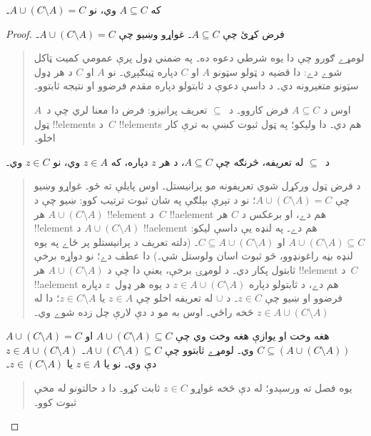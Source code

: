 \documentclass[../../../include/open-logic-section]{subfiles}
\begin{document}


\begin{prop}
که $A \subseteq C$ وي، نو $A \cup (C \setminus A) = C$۔
\end{prop}  

\begin{proof}
  فرض کړئ چې $A \subseteq C$۔ غواړو وښيو چې $A \cup (C
  \setminus A) = C$۔
  \begin{quote}
    لومړے ګورو چې دا يوه شرطي دعوه ده۔ په ضمني ډول پرې عمومي
    کمیت ټاکل شوے دے: دا قضيه د ټولو سټونو $A$ او $C$ دپاره
    ټينګېږي۔ نو $A$ او $C$ د هر ډول سټونو متغيرونه دي۔ د داسې
    دعوې د ثابتولو دپاره مقدم فرضوو او نتيجه ثابتوو۔

    اوس د $A \subseteq C$ فرض کاروو۔ د~$\subseteq$ تعريف
    پرانيزو: فرض دا معنا لري چې د~$A$ ټول !!{element}s د~$C$
    !!{element}s هم دي۔ دا وليکو؛ په ټول ثبوت کښې به ترې کار اخلو۔
  \end{quote}
  د~$\subseteq$ له تعريفه، څرنګه چې $A \subseteq C$، د هر
  $z$ دپاره، که $z \in A$ وي، نو $z \in C$ وي۔
  \begin{quote}
    د فرض ټول ورکړل شوي تعريفونه مو پرانيستل۔ اوس پايلې ته ځو۔
    غواړو وښيو چې $A \cup (C \setminus A) = C$؛ نو د تېرې
    بېلګې په شان ثبوت ترتيب کوو: ښيو چې د
    $A \cup (C \setminus A)$ هر !!{element} د~$C$ !!a{element}
    هم دے، او برعکس د $C$ هر !!{element} د $A \cup (C
    \setminus A)$ !!a{element} هم دے۔ په لنډه يې داسې ليکو:
    $A \cup (C \setminus A) \subseteq C$ او
    $C \subseteq A \cup (C \setminus A)$۔ (دلته تعريف د
    پرانيستلو پر ځاے په يوه لنډه بڼه راغونډوو، څو ثبوت اسان
    ولوستل شي۔) دا عطف دے؛ نو دواړه برخې ثابتول پکار دي۔
    د لومړۍ برخې، يعنې دا چې د $A \cup (C \setminus A)$ هر
    !!{element} د~$C$ !!a{element} هم دے، د ثابتولو دپاره
    $z \in A \cup (C \setminus A)$ د يوه هر ډول~$z$ دپاره
    فرضوو او ښيو چې $z \in C$۔
    د $\cup$ له تعريفه اخلو چې $z \in A$ يا
    $z \in C \setminus A$؛ دا له
    $z \in A \cup (C \setminus A)$ څخه راځي۔ اوس به مو د
    دې لارې چل زده شوے وي۔
    \end{quote}
  $A \cup (C \setminus A) = C$ هغه وخت او يوازې هغه وخت وي
  چې $A \cup (C \setminus A) \subseteq
  C$ او $C \subseteq (A \cup (C \setminus A))$ وي۔
  لومړے ثابتوو چې $A \cup (C \setminus A) \subseteq C$۔
  $z \in A \cup (C
  \setminus A)$ دې وي۔ نو يا $z \in A$ يا $z \in (C \setminus A)$۔
  \begin{quote}
    يوه فصل ته ورسېدو؛ له دې څخه غواړو $z \in C$ ثابت کړو۔
    دا د حالتونو له مخې ثبوت کوو۔

\end{quote}
\end{proof}
\end{document}
